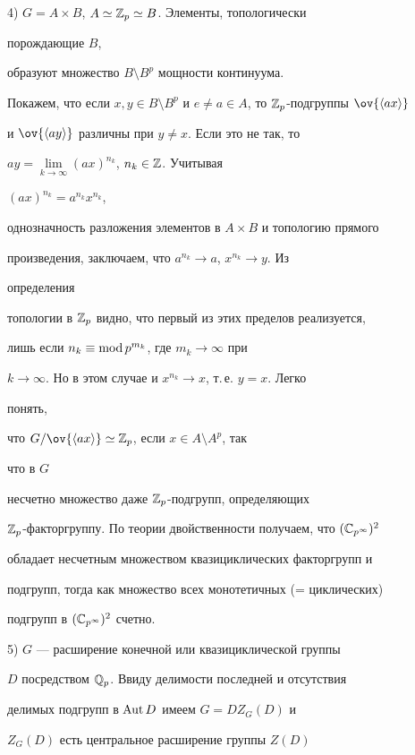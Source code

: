  


4) $G=A\times B$, $A\simeq\Bbb Z_p\simeq B$. Элементы, топологически 


порождающие $B$, 


образуют множество $B\setminus B^p$ мощности континуума.  


Покажем, что если $x,y\in B\setminus B^p$ и $e\ne a\in A$, то $\Bbb 


Z_p$-подгруппы $\ov{\la ax\ra}$ 


и $\ov{\la ay\ra}$ различны при $y\ne x$. Если это не так, то 


$ay=\lim\limits_{k\to\infty}(ax)^{n_k}$, $n_k\in\Bbb Z$. Учитывая 


$(ax)^{n_k}=a^{n_k}x^{n_k}$, 


однозначность разложения элементов в $A\times B$ и топологию прямого 


произведения, заключаем, что $a^{n_k}\to a$, $x^{n_k}\to y$. Из 


определения 


топологии в $\Bbb Z_p$ видно, что первый из этих пределов реализуется,


лишь если $n_k\equiv\operatorname{mod} p^{m_k}$, где $m_k\to\infty$ при  


$k\to \infty$. Но в этом случае и $x^{n_k}\to x$, т.\,е. $y=x$. Легко 


понять, 


что $G/\ov{\la ax\ra}\simeq\Bbb Z_p$, если $x\in A\setminus A^p$, так 


что в $G$ 


несчетно множество даже $\Bbb Z_p$-подгрупп, определяющих 


$\Bbb Z_p$-факторгруппу. По теории двойственности получаем, что $(\Bbb 


C_{p^\infty})^2$ 


обладает несчетным множеством квазициклических факторгрупп и  


подгрупп, тогда как множество всех монотетичных (= циклических) 


подгрупп в $(\Bbb C_{p^\infty})^2$ счетно. 


 


5) $G$ --- расширение конечной или квазициклической группы  


$D$ посредством $\Bbb Q_p$. Ввиду делимости последней и отсутствия  


делимых подгрупп в $\operatorname{Aut} D$ имеем $G=D Z_G(D)$ и 


$Z_G(D)$ есть центральное расширение группы $Z(D)$  


